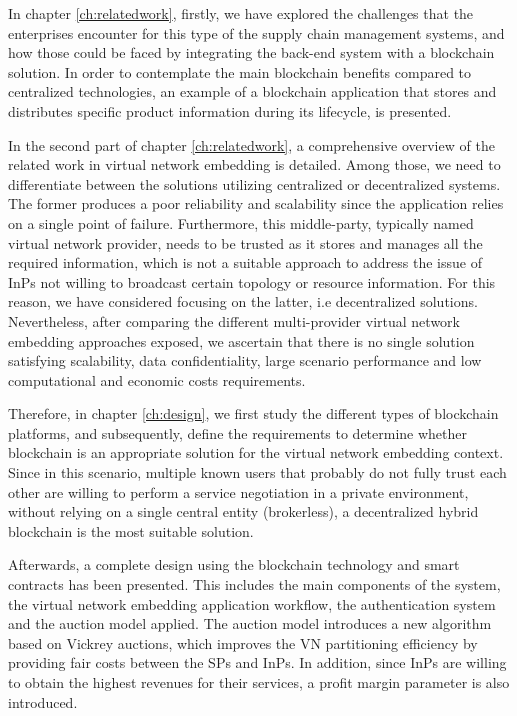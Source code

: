 In chapter \ref{ch:relatedwork}, firstly, we have explored the challenges that the enterprises encounter for this type of the supply chain management systems, and how those could be faced by integrating the back-end system with a blockchain solution. In order to contemplate the main blockchain benefits compared to centralized technologies, an example of a blockchain application that stores and distributes specific product information during its lifecycle, is presented.

In the second part of chapter \ref{ch:relatedwork}, a comprehensive overview of the related work in virtual network embedding is detailed. Among those, we need to differentiate between the solutions utilizing centralized or decentralized systems. The former produces a poor reliability and scalability since the application relies on a single point of failure. Furthermore, this middle-party, typically named virtual network provider, needs to be trusted as it stores and manages all the required information, which is not a suitable approach to address the issue of InPs not willing to broadcast certain topology or resource information. For this reason, we have considered focusing on the latter, i.e decentralized solutions. Nevertheless, after comparing the different multi-provider virtual network embedding approaches exposed, we ascertain that there is no single solution satisfying scalability, data confidentiality, large scenario performance and low computational and economic costs requirements.

Therefore, in chapter \ref{ch:design}, we first study the different types of blockchain platforms, and subsequently, define the requirements to determine whether blockchain is an appropriate solution for the virtual network embedding context. Since in this scenario, multiple known users that probably do not fully trust each other are willing to perform a service negotiation in a private environment, without relying on a single central entity (brokerless), a decentralized hybrid blockchain is the most suitable solution.

Afterwards, a complete design using the blockchain technology and smart contracts has been presented. This includes the main components of the system, the virtual network embedding application workflow, the authentication system and the auction model applied. The auction model introduces a new algorithm based on Vickrey auctions, which improves the VN partitioning efficiency by providing fair costs between the SPs and InPs. In addition, since InPs are willing to obtain the highest revenues for their services, a profit margin parameter is also introduced.

